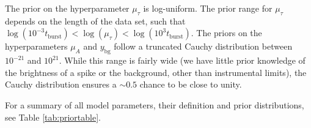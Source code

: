 \documentclass[12pt]{emulateapj}
\newcommand{\counts}{y}
\begin{document}


The prior on the hyperparameter $\mu_{\tau}$ is log-uniform. The prior range for
$\mu_{\tau}$ depends on the length of the data set, such that $\log{(10^{-3}t_{\mathrm{burst}})} < \log{(\mu_{\tau})} < \log{(10^{3}t_\mathrm{burst})}$.
The priors on the hyperparameters $\mu_A$ and $\counts_{\mathrm{bg}}$ follow a truncated Cauchy distribution between $10^{-21}$ and $10^{21}$. While
this range is fairly wide (we have little prior knowledge of the brightness of a spike or the background, other than instrumental limits), the Cauchy distribution ensures a $\sim 0.5$ chance to be close to unity.

For a summary of all model parameters, their definition and prior distributions, see Table \ref{tab:priortable}.
\end{document}
